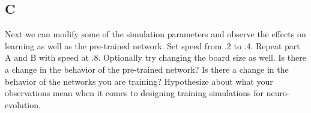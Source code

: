 \documentclass[12]{extarticle}
\begin{document}
\subsection{C}
Next we can modify some of the simulation parameters and observe the effects on learning as well as the pre-trained network. Set speed from .2 to .4. Repeat part A and B with speed at .8. Optionally try changing the board size as well. Is there a change in the behavior of the pre-trained network? Is there a change in the behavior of the networks you are training? Hypothesize about what your observations mean when it comes to designing training simulations for neuro-evolution.

  


{}

\end{document}
